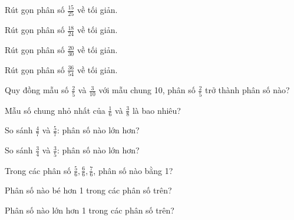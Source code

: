 \begin{ex}
Rút gọn phân số $\frac{15}{25}$ về tối giản.
\end{ex}

\begin{ex}
Rút gọn phân số $\frac{18}{24}$ về tối giản.
\end{ex}

\begin{ex}
Rút gọn phân số $\frac{20}{30}$ về tối giản.
\end{ex}

\begin{ex}
Rút gọn phân số $\frac{36}{54}$ về tối giản.
\end{ex}

\begin{ex}
Quy đồng mẫu số $\frac{2}{5}$ và $\frac{3}{10}$ với mẫu chung 10, phân số $\frac{2}{5}$ trở thành phân số nào?
\end{ex}

\begin{ex}
Mẫu số chung nhỏ nhất của $\frac{1}{6}$ và $\frac{3}{8}$ là bao nhiêu?
\end{ex}

\begin{ex}
So sánh $\frac{4}{7}$ và $\frac{5}{7}$: phân số nào lớn hơn?
\end{ex}

\begin{ex}
So sánh $\frac{3}{4}$ và $\frac{3}{5}$: phân số nào lớn hơn?
\end{ex}

\begin{ex}
Trong các phân số $\frac{5}{6}, \frac{6}{6}, \frac{7}{6}$, phân số nào bằng 1?
\end{ex}

\begin{ex}
Phân số nào bé hơn 1 trong các phân số trên?
\end{ex}

\begin{ex}
Phân số nào lớn hơn 1 trong các phân số trên?
\end{ex}

